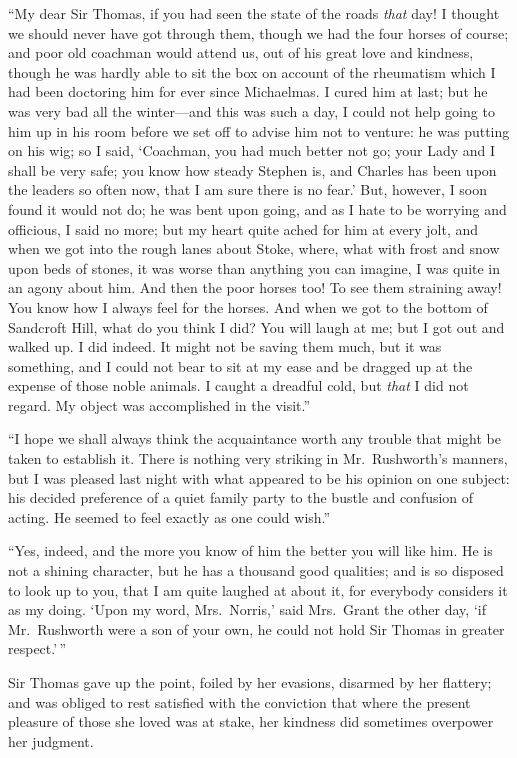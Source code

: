 \documentclass{article}
\begin{document}
``My dear Sir Thomas, if you had seen the state of the
roads \emph{that} day!  I thought we should never have got
through them, though we had the four horses of course;
and poor old coachman would attend us, out of his great love
and kindness, though he was hardly able to sit the box
on account of the rheumatism which I had been doctoring
him for ever since Michaelmas.  I cured him at last;
but he was very bad all the winter---and this was such a day,
I could not help going to him up in his room before we set
off to advise him not to venture:  he was putting on his wig;
so I said, `Coachman, you had much better not go; your Lady
and I shall be very safe; you know how steady Stephen is,
and Charles has been upon the leaders so often now,
that I am sure there is no fear.'  But, however, I soon
found it would not do; he was bent upon going, and as I
hate to be worrying and officious, I said no more; but my
heart quite ached for him at every jolt, and when we got
into the rough lanes about Stoke, where, what with frost
and snow upon beds of stones, it was worse than anything
you can imagine, I was quite in an agony about him.
And then the poor horses too!  To see them straining away!
You know how I always feel for the horses.  And when we got
to the bottom of Sandcroft Hill, what do you think I did?
You will laugh at me; but I got out and walked up.
I did indeed.  It might not be saving them much, but it
was something, and I could not bear to sit at my ease
and be dragged up at the expense of those noble animals.
I caught a dreadful cold, but \emph{that} I did not regard.
My object was accomplished in the visit.''

``I hope we shall always think the acquaintance worth
any trouble that might be taken to establish it.
There is nothing very striking in Mr.\ Rushworth's manners,
but I was pleased last night with what appeared to be his
opinion on one subject:  his decided preference of a quiet
family party to the bustle and confusion of acting.
He seemed to feel exactly as one could wish.''

``Yes, indeed, and the more you know of him the better
you will like him.  He is not a shining character,
but he has a thousand good qualities; and is so disposed
to look up to you, that I am quite laughed at about it,
for everybody considers it as my doing.  `Upon my word,
Mrs.\ Norris,' said Mrs.\ Grant the other day, `if Mr.\ Rushworth
were a son of your own, he could not hold Sir Thomas
in greater respect.'\,''

Sir Thomas gave up the point, foiled by her evasions,
disarmed by her flattery; and was obliged to rest
satisfied with the conviction that where the present
pleasure of those she loved was at stake, her kindness
did sometimes overpower her judgment.
\end{document}
